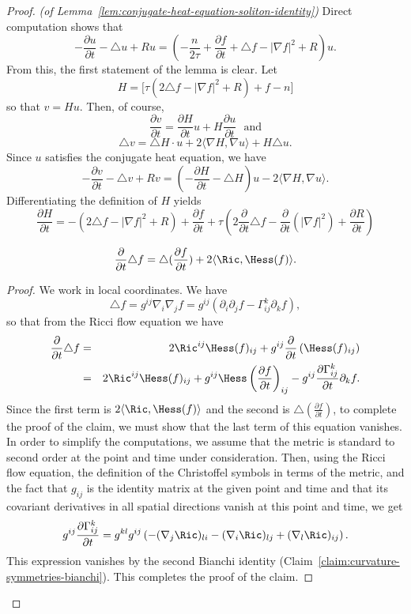 \begin{proof}{\em (of Lemma~\ref{lem:conjugate-heat-equation-soliton-identity})}
Direct computation shows that $$-\frac{\partial u}{\partial
t}-\triangle u+Ru= \left(-\frac{n}{2\tau}+\frac{\partial f}{\partial
t}+\triangle f-|\nabla f|^2+R\right)u.$$ From this, the first
statement of the lemma is clear.
 Let
$$H=\bigl[\tau(2\triangle f-|\nabla f|^2+R)+f-n\bigr]$$ so that $v=Hu$.
Then, of course,
$$\frac{\partial v}{\partial t}=\frac{\partial H}{\partial t}u+H\frac{\partial u}{\partial t}\ \ \ \mathrm{and}$$
$$\triangle v=\triangle H\cdot u+2\langle\nabla H,\nabla u\rangle+H\triangle u.$$
Since $u$ satisfies the conjugate heat equation, we have
$$-\frac{\partial v}{\partial t}-\triangle v+Rv=\left(-\frac{\partial H}{\partial t}-\triangle
H\right)u-2\langle\nabla H,\nabla u\rangle.$$ Differentiating the
definition of $H$ yields \begin{equation}\label{dHeqn}
\frac{\partial H}{\partial t} = -(2\triangle f-|\nabla
f|^2+R)+\frac{\partial f}{\partial t}+ \tau \left(2\frac{\partial
}{\partial t}\triangle f -\frac{\partial }{\partial t}(|\nabla
f|^2)+\frac{\partial R}{\partial t}\right)
\end{equation}


\begin{claim}\label{claim:laplacian-time-derivative-commutation}
\label{11.20}
$$\frac{\partial }{\partial t}\triangle
f=\triangle(\frac{\partial f}{\partial t})+2\langle \Ric,\Hess(f)\rangle.$$
\end{claim}

\begin{proof}
We work in local coordinates. We have $$\triangle
f=g^{ij}\nabla_i\nabla_j
f=g^{ij}(\partial_i\partial_jf-\Gamma_{ij}^k\partial_kf),$$ so that
from the Ricci flow equation we have
\begin{eqnarray*}
\frac{\partial }{\partial t}\triangle f & = & 2\Ric^{ij}\Hess(f)_{ij}+g^{ij}\frac{\partial}{\partial t}\left(\Hess(f)_{ij}\right)
\\
& = & 2\Ric^{ij}\Hess(f)_{ij}+g^{ij}\Hess\left({\frac{\partial f}{\partial
t}}\right)_{ij}-g^{ij}\frac{\partial \Gamma_{ij}^k}{\partial
t}\partial_kf.
\end{eqnarray*}
Since the first term is $2\langle \Ric,\Hess(f)\rangle$
and the second is $\triangle(\frac{\partial f}{\partial t})$, to
complete the proof of the claim, we must show that the last term of
this equation vanishes. In order to simplify the computations, we
assume that the metric is standard to second order at the point and
time under consideration. Then, using the Ricci flow equation, the
definition of the Christoffel symbols in terms of the metric, and
the fact that $g_{ij}$ is the identity matrix at the given point and
time and that its covariant derivatives in all spatial directions
vanish at this point and time, we get
$$g^{ij}\frac{\partial \Gamma_{ij}^k}{\partial t}=g^{kl}g^{ij}\left(-(\nabla_j \Ric)_{li}-(\nabla_i
 \Ric)_{lj}+(\nabla_l\Ric)_{ij}\right).$$
 This expression vanishes by the second Bianchi identity (Claim~\ref{claim:curvature-symmetries-bianchi}).
 This completes the proof of the claim.
\end{proof}


\end{proof}
